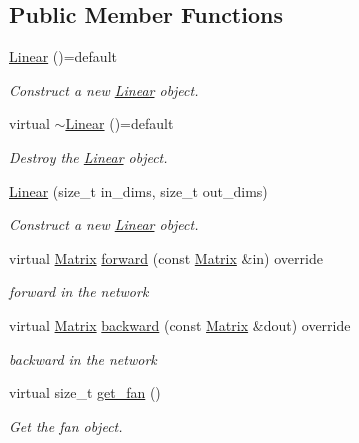 \subsection*{Public Member Functions}
\begin{DoxyCompactItemize}
\item 
\mbox{\hyperlink{class_linear_a905089a6472d97cc8b1d201fdd3deef9}{Linear}} ()=default
\begin{DoxyCompactList}\small\item\em Construct a new \mbox{\hyperlink{class_linear}{Linear}} object. \end{DoxyCompactList}\item 
virtual \mbox{\hyperlink{class_linear_a42109067fe1d9da36148f7c4f330b564}{$\sim$\+Linear}} ()=default
\begin{DoxyCompactList}\small\item\em Destroy the \mbox{\hyperlink{class_linear}{Linear}} object. \end{DoxyCompactList}\item 
\mbox{\hyperlink{class_linear_a335a168705982b1dbf9c16b89465995e}{Linear}} (size\+\_\+t in\+\_\+dims, size\+\_\+t out\+\_\+dims)
\begin{DoxyCompactList}\small\item\em Construct a new \mbox{\hyperlink{class_linear}{Linear}} object. \end{DoxyCompactList}\item 
virtual \mbox{\hyperlink{class_layer_a22b1e7286096aa62bd245536c8ebdaf1}{Matrix}} \mbox{\hyperlink{class_linear_a901668e9219a8d446b2ac60718b9c9f1}{forward}} (const \mbox{\hyperlink{class_layer_a22b1e7286096aa62bd245536c8ebdaf1}{Matrix}} \&in) override
\begin{DoxyCompactList}\small\item\em forward in the network \end{DoxyCompactList}\item 
virtual \mbox{\hyperlink{class_layer_a22b1e7286096aa62bd245536c8ebdaf1}{Matrix}} \mbox{\hyperlink{class_linear_a747db1996e723fae7c9713d4b7f303af}{backward}} (const \mbox{\hyperlink{class_layer_a22b1e7286096aa62bd245536c8ebdaf1}{Matrix}} \&dout) override
\begin{DoxyCompactList}\small\item\em backward in the network \end{DoxyCompactList}\item 
virtual size\+\_\+t \mbox{\hyperlink{class_linear_a753a7cb02a0b18e8922d23db905eb534}{get\+\_\+fan}} ()
\begin{DoxyCompactList}\small\item\em Get the fan object. \end{DoxyCompactList}\end{DoxyCompactItemize}
